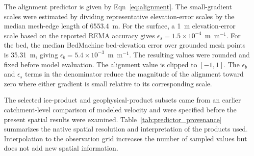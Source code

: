 \documentclass[review,jog]{igs}
\begin{document}
The alignment predictor is given by Eqn~\ref{eq:alignment}. The small-gradient
scales were estimated by dividing representative elevation-error scales by the
median mesh-edge length of 6553.4~m. For the surface, a 1~m elevation-error
scale based on the reported REMA accuracy gives
$\epsilon_s=1.5\times10^{-4}$~m~m$^{-1}$. For the bed, the median BedMachine
bed-elevation error over grounded mesh points is 35.31~m, giving
$\epsilon_b=5.4\times10^{-3}$~m~m$^{-1}$. The resulting values were rounded and fixed before model evaluation. The
alignment value is clipped to $[-1,1]$. The $\epsilon_b$ and $\epsilon_s$
terms in the denominator reduce the magnitude of the alignment toward zero
where either gradient is small relative to its corresponding scale.

The selected ice-product and geophysical-product subsets came from an earlier catchment-level comparison of modeled velocity and were specified before the present spatial results were examined. Table~\ref{tab:predictor_provenance} summarizes the native spatial resolution and interpretation of the products used. Interpolation to the observation grid increases the number of sampled values but does not add new spatial information.
\end{document}
